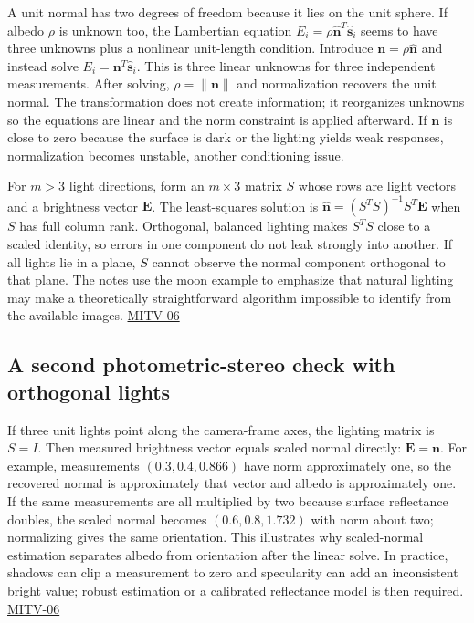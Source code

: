 A unit normal has two degrees of freedom because it lies on the unit sphere. If albedo \(\rho\) is unknown too, the Lambertian equation \(E_i=\rho\hat{\mathbf n}^T\hat{\mathbf s}_i\) seems to have three unknowns plus a nonlinear unit-length condition. Introduce \(\mathbf n=\rho\hat{\mathbf n}\) and instead solve \(E_i=\mathbf n^T\hat{\mathbf s}_i\). This is three linear unknowns for three independent measurements. After solving, \(\rho=\|\mathbf n\|\) and normalization recovers the unit normal. The transformation does not create information; it reorganizes unknowns so the equations are linear and the norm constraint is applied afterward. If \(\mathbf n\) is close to zero because the surface is dark or the lighting yields weak responses, normalization becomes unstable, another conditioning issue.

For \(m>3\) light directions, form an \(m\times3\) matrix \(S\) whose rows are light vectors and a brightness vector \(\mathbf E\). The least-squares solution is \(\hat{\mathbf n}=(S^TS)^{-1}S^T\mathbf E\) when \(S\) has full column rank. Orthogonal, balanced lighting makes \(S^TS\) close to a scaled identity, so errors in one component do not leak strongly into another. If all lights lie in a plane, \(S\) cannot observe the normal component orthogonal to that plane. The notes use the moon example to emphasize that natural lighting may make a theoretically straightforward algorithm impossible to identify from the available images. \hyperref[04-visual-computing-ii-ch036-mitv-06---photometric-stereo-noise-gain-error-amplification-eigenvalues-and-eigenvectors-review]{MITV-06}

\subsection{A second photometric-stereo check with orthogonal lights}\label{04-visual-computing-ii-ch032-a-second-photometric-stereo-check-with-orthogonal-lights}

If three unit lights point along the camera-frame axes, the lighting matrix is \(S=I\). Then measured brightness vector equals scaled normal directly: \(\mathbf E=\mathbf n\). For example, measurements \((0.3,0.4,0.866)\) have norm approximately one, so the recovered normal is approximately that vector and albedo is approximately one. If the same measurements are all multiplied by two because surface reflectance doubles, the scaled normal becomes \((0.6,0.8,1.732)\) with norm about two; normalizing gives the same orientation. This illustrates why scaled-normal estimation separates albedo from orientation after the linear solve. In practice, shadows can clip a measurement to zero and specularity can add an inconsistent bright value; robust estimation or a calibrated reflectance model is then required. \hyperref[04-visual-computing-ii-ch036-mitv-06---photometric-stereo-noise-gain-error-amplification-eigenvalues-and-eigenvectors-review]{MITV-06}

